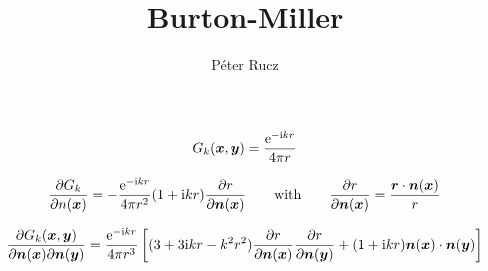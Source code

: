 \documentclass[a4paper, 10pt]{article}
\author{Péter Rucz}
\title{Burton-Miller}
\newcommand{\te}{\mathrm{e}}
\newcommand{\ti}{\mathrm{i}}
\newcommand{\tn}{\bm{\mathnormal{n}}}
\newcommand{\tr}{\bm{\mathnormal{r}}}
\newcommand{\tx}{\bm{\mathnormal{x}}}
\newcommand{\ty}{\bm{\mathnormal{y}}}
\begin{document}
\maketitle

\begin{equation}
	G_k(\tx, \ty) = \frac{\te^{-\ti k r}}{4 \pi r}
\end{equation}

\begin{equation}
	\frac{\partial G_k}{\partial n(\tx)} = -\frac{\te^{-\ti k r}}{4 \pi r^2}(1 + \ti kr)\frac{\partial r}{\partial \tn(\tx)} \qquad \text{with} \qquad \frac{\partial r}{\partial \tn(\tx)} = \frac{\tr \cdot \tn(\tx)}{r}
\end{equation}


\begin{equation}
	\frac{\partial G_k(\tx, \ty)}{\partial \tn(\tx) \partial \tn(\ty)} = \frac{\te^{- \ti kr}}{4 \pi r^3}\left[(3 + 3 \ti kr - k^2 r^2) \frac{\partial r}{\partial \tn(\tx)}\frac{\partial r}{\partial \tn(\ty)} + (1 + \ti kr) \tn(\tx) \cdot \tn (\ty) \right]
\end{equation}


\begin{align}
\end{align}
\end{document}
